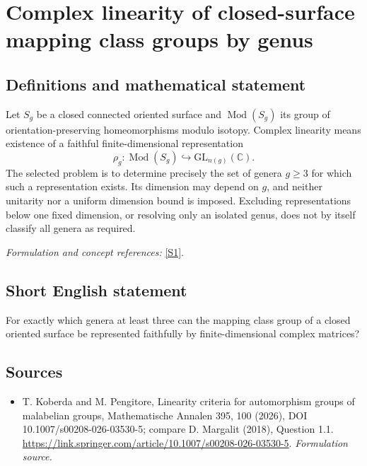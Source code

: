 \documentclass[11pt]{article}
\begin{document}
\section*{\texorpdfstring{Complex linearity of closed-surface mapping class groups by genus}{Complex linearity of closed-surface mapping class groups by genus}}\label{30006983}
\subsection{Definitions and mathematical statement}
Let $S_g$ be a closed connected oriented surface and
$\operatorname{Mod}(S_g)$ its group of orientation-preserving homeomorphisms modulo isotopy. Complex linearity means existence of a faithful finite-dimensional representation
\[
 \rho_g:\operatorname{Mod}(S_g)\hookrightarrow\mathrm{GL}_{n(g)}({\mathbb{C}}).
\]
The selected problem is to determine precisely the set of genera $g\ge3$ for which such a representation exists. Its dimension may depend on $g$, and neither unitarity nor a uniform dimension bound is imposed. Excluding representations below one fixed dimension, or resolving only an isolated genus, does not by itself classify all genera as required.
\par\smallskip\textit{Formulation and concept references:} \href{https://link.springer.com/article/10.1007/s00208-026-03530-5}{[S1]}.

\subsection{Short English statement}
For exactly which genera at least three can the mapping class group of a closed oriented surface be represented faithfully by finite-dimensional complex matrices?
\subsection{Sources}
\begin{itemize}
\item[S1]T. Koberda and M. Pengitore, Linearity criteria for automorphism groups of malabelian groups, Mathematische Annalen 395, 100 (2026), DOI 10.1007/s00208-026-03530-5; compare D. Margalit (2018), Question 1.1.
\url{https://link.springer.com/article/10.1007/s00208-026-03530-5}.
\textit{Formulation source.}
\end{itemize}
\end{document}
